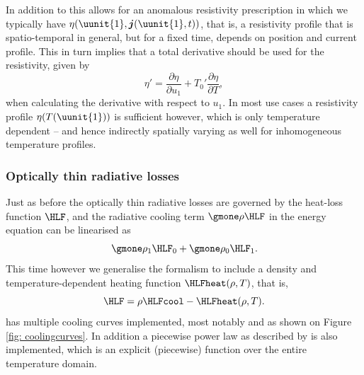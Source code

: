 In addition to this {\legolas} allows for an anomalous resistivity prescription in which we typically have $\eta(\uunit{1}, \boldsymbol{j}(\uunit{1}, t))$, that is, a resistivity profile that is spatio-temporal in general, but for a fixed time, depends on position and current profile. This in turn implies that a total derivative should be used for the resistivity, given by
\begin{equation}
  \eta' = \frac{\partial \eta}{\partial u_1} + T_0'\frac{\partial \eta}{\partial T},
\end{equation}
when calculating the derivative with respect to $u_1$. In most use cases a resistivity profile $\eta(T(\uunit{1}))$ is sufficient however, which is only temperature dependent -- and hence indirectly spatially varying as well for inhomogeneous temperature profiles.

\subsubsection{Optically thin radiative losses}
Just as before the optically thin radiative losses are governed by the heat-loss function $\HLF$, and the radiative cooling term $\gmone \rho \HLF$ in the energy equation can be linearised as
\begin{equation}
  \gmone \rho_1 \HLF_0 + \gmone \rho_0 \HLF_1.
\end{equation}
This time however we generalise the formalism to include a density and temperature-dependent heating function
$\HLFheat(\rho, T)$, that is,
\begin{equation}
  \HLF = \rho\HLFcool - \HLFheat(\rho, T).
\end{equation}
{\legolas} has multiple cooling curves implemented, most notably {\jccorona} and {\spexdm} as shown on Figure \ref{fig: coolingcurves}. In addition a piecewise power law as described by \citet{rosner1978} is also implemented, which is an explicit (piecewise) function over the entire temperature domain.

